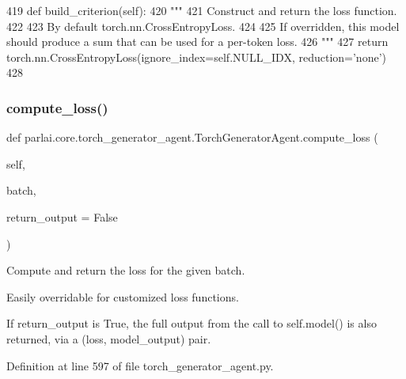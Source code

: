 \begin{DoxyCode}
419     \textcolor{keyword}{def }build\_criterion(self):
420         \textcolor{stringliteral}{"""}
421 \textcolor{stringliteral}{        Construct and return the loss function.}
422 \textcolor{stringliteral}{}
423 \textcolor{stringliteral}{        By default torch.nn.CrossEntropyLoss.}
424 \textcolor{stringliteral}{}
425 \textcolor{stringliteral}{        If overridden, this model should produce a sum that can be used for a per-token loss.}
426 \textcolor{stringliteral}{        """}
427         \textcolor{keywordflow}{return} torch.nn.CrossEntropyLoss(ignore\_index=self.NULL\_IDX, reduction=\textcolor{stringliteral}{'none'})
428 
\end{DoxyCode}
\mbox{\label{classparlai_1_1core_1_1torch__generator__agent_1_1TorchGeneratorAgent_a94808a13bba0d5283613acd98516bd3c}} 
\subsubsection{\texorpdfstring{compute\+\_\+loss()}{compute\_loss()}}
{\footnotesize\ttfamily def parlai.\+core.\+torch\+\_\+generator\+\_\+agent.\+Torch\+Generator\+Agent.\+compute\+\_\+loss (\begin{DoxyParamCaption}\item[{}]{self,  }\item[{}]{batch,  }\item[{}]{return\+\_\+output = {\ttfamily False} }\end{DoxyParamCaption})}

\begin{DoxyVerb}Compute and return the loss for the given batch.

Easily overridable for customized loss functions.

If return_output is True, the full output from the call to self.model()
is also returned, via a (loss, model_output) pair.
\end{DoxyVerb}
 

Definition at line 597 of file torch\+\_\+generator\+\_\+agent.\+py.


